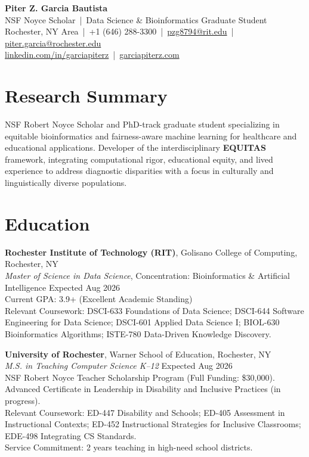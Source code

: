 \documentclass[11pt,letterpaper]{article}
\begin{document}
\begin{center}
    {\LARGE \textbf{Piter Z. Garcia Bautista}}\\[4pt]
    NSF Noyce Scholar \,|\, Data Science \& Bioinformatics Graduate Student\\[3pt]
    Rochester, NY Area \,|\, +1 (646) 288-3300 \,|\, 
    \href{mailto:pzg8794@rit.edu}{pzg8794@rit.edu} \,|\, 
    \href{mailto:piter.garcia@rochester.edu}{piter.garcia@rochester.edu}\\[2pt]
    \href{https://linkedin.com/in/garciapiterz}{linkedin.com/in/garciapiterz} \,|\, 
    \href{https://garciapiterz.com}{garciapiterz.com}
\end{center}

\section{Research Summary}

NSF Robert Noyce Scholar and PhD-track graduate student specializing in equitable bioinformatics and fairness-aware machine learning for healthcare and educational applications. Developer of the interdisciplinary \textbf{EQUITAS} framework, integrating computational rigor, educational equity, and lived experience to address diagnostic disparities with a focus in culturally and linguistically diverse populations.

\section{Education}

\textbf{Rochester Institute of Technology (RIT)}, Golisano College of Computing, Rochester, NY\\
\textit{Master of Science in Data Science}, Concentration: Bioinformatics \& Artificial Intelligence \hfill Expected Aug 2026\\
Current GPA: 3.9+ (Excellent Academic Standing)\\
Relevant Coursework: DSCI-633 Foundations of Data Science; DSCI-644 Software Engineering for Data Science; DSCI-601 Applied Data Science I; BIOL-630 Bioinformatics Algorithms; ISTE-780 Data-Driven Knowledge Discovery.

\vspace{4pt}
\textbf{University of Rochester}, Warner School of Education, Rochester, NY\\
\textit{M.S. in Teaching Computer Science K–12} \hfill Expected Aug 2026\\
NSF Robert Noyce Teacher Scholarship Program (Full Funding: \$30,000).\\
Advanced Certificate in Leadership in Disability and Inclusive Practices (in progress).\\
Relevant Coursework: ED-447 Disability and Schools; ED-405 Assessment in Instructional Contexts; ED-452 Instructional Strategies for Inclusive Classrooms; EDE-498 Integrating CS Standards.\\
Service Commitment: 2 years teaching in high-need school districts.
\end{document}
